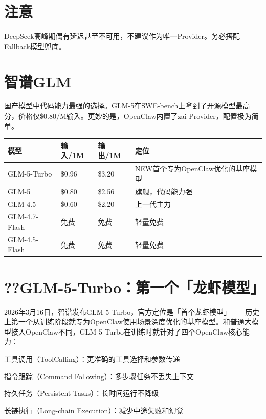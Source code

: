 \documentclass[
  10
]{article}
\newcounter{none} %
\begin{document}
\section{注意}\label{ux6ce8ux610f-16}

DeepSeek高峰期偶有延迟甚至不可用，不建议作为唯一Provider。务必搭配Fallback模型兜底。

\section{智谱GLM}\label{ux667aux8c31glm}

国产模型中代码能力最强的选择。GLM-5在SWE-bench上拿到了开源模型最高分，价格仅\$0.80/M输入。更妙的是，OpenClaw内置了zai
Provider，配置极为简单。

{\def\LTcaptype{none} %
\begin{longtable}[]{@{}|l|l|l|l|@{}}
\toprule\noalign{}
\endhead
\bottomrule\noalign{}
\endlastfoot
\hline
模型 & 输入/1M & 输出/1M & 定位 \\
\hline
GLM-5-Turbo & \$0.96 & \$3.20 & NEW首个专为OpenClaw优化的基座模型 \\
\hline
GLM-5 & \$0.80 & \$2.56 & 旗舰，代码能力强 \\
\hline
GLM-4.5 & \$0.60 & \$2.20 & 上一代主力 \\
\hline
GLM-4.7-Flash & 免费 & 免费 & 轻量免费 \\
\hline
GLM-4.5-Flash & 免费 & 免费 & 轻量免费 \\
\hline
\end{longtable}
}

\section{??GLM-5-Turbo：第一个「龙虾模型」}\label{glm-5-turboux7b2cux4e00ux4e2aux9f99ux867eux6a21ux578b}

2026年3月16日，智谱发布GLM-5-Turbo，官方定位是「首个龙虾模型」------历史上第一个从训练阶段就专为OpenClaw使用场景深度优化的基座模型。和普通大模型接入OpenClaw不同，GLM-5-Turbo在训练时就针对了四个OpenClaw核心能力：

工具调用（ToolCalling）：更准确的工具选择和参数传递

指令跟踪（Command Following）：多步骤任务不丢失上下文

持久任务（Persistent Tasks）：长时间运行不降级

长链执行（Long-chain Execution）：减少中途失败和幻觉
\end{document}

